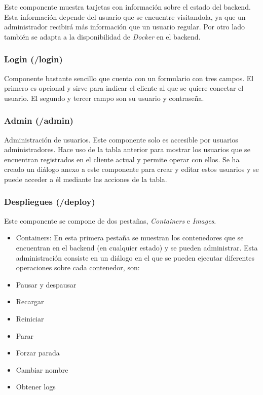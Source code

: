 Este componente muestra tarjetas con información sobre el estado del backend. Esta información depende del usuario que se encuentre visitandola, ya que un administrador recibirá más información que un usuario regular. Por otro lado también se adapta a la disponibilidad de \textit{Docker} en el backend.


\subsubsection{Login (/login)}


Componente bastante sencillo que cuenta con un formulario con tres campos. El primero es opcional y sirve para indicar el cliente al que se quiere conectar el usuario. El segundo y tercer campo son su usuario y contraseña.


\subsubsection{Admin (/admin)}
\label{sec:admin}

Administración de usuarios. Este componente solo es accesible por usuarios administradores. Hace uso de la tabla anterior para mostrar los usuarios que se encuentran registrados en el cliente actual y permite operar con ellos. Se ha creado un diálogo anexo a este componente para crear y editar estos usuarios y se puede acceder a él mediante las acciones de la tabla.



\subsubsection{Despliegues (/deploy)}

Este componente se compone de dos pestañas, \textit{Containers} e \textit{Images}.
\begin{itemize}
	\item Containers: En esta primera pestaña se muestran los contenedores que se encuentran en el backend (en cualquier estado) y se pueden administrar. Esta administración consiste en un diálogo en el que se pueden ejecutar diferentes operaciones sobre cada contenedor, son:
	\item Pausar y despausar
	\item Recargar
	\item Reiniciar
	\item Parar
	\item Forzar parada
	\item Cambiar nombre
	\item Obtener logs
\end{itemize}

